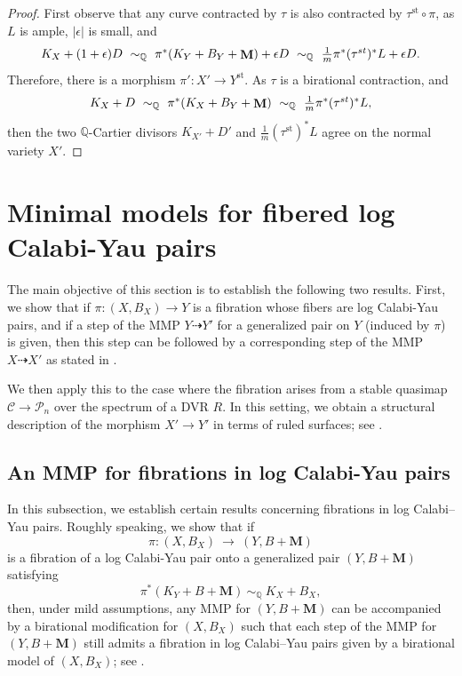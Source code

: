 \documentclass[a4paper,12pt]{amsart}
\DeclareMathOperator{\st}{st}
\newcommand{\bQ}{{\mathbb Q}}
\newcommand{\sP}{{\mathscr{P}}}
\DeclareMathOperator{\bfM}{{\bf{M}}}
\newcommand\cC{{\mathcal{C}}}
\theoremstyle{definition}
\theoremstyle{remark}
\begin{document}
\begin{proof}
First observe that any curve contracted by $\tau$ is also contracted by $\tau^{\st}\circ \pi$, as $L$ is ample, $|\epsilon|$ is small, and
\[\textstyle
K_X+(1+\epsilon)D \ \sim_\bQ\  \pi^*(K_Y+B_Y+\bfM) +\epsilon D \ \sim_{\bQ} \ \frac{1}{m}\pi^*(\tau^{st})^*L+\epsilon D .
\]
    Therefore, there is a morphism $\pi'\colon X'\to Y^{\st}$. As $\tau$ is a birational contraction, and \[\textstyle K_X+D\ \sim_\bQ\  \pi^*(K_X+B_Y+\bfM) \ \sim_\bQ \ \frac{1}{m}\pi^*(\tau^{st})^*L,\]
    then the two $\bQ$-Cartier divisors $K_{X'}+D'$ and $\frac{1}{m}(\tau^{\st})^*L$ agree on the normal variety $X'$.
\end{proof}



\section{Minimal models for fibered log Calabi-Yau pairs}\label{section_stable_reduction}


The main objective of this section is to establish the following two results.  
First, we show that if $\pi\colon (X,B_X) \to Y$ is a fibration whose fibers are log Calabi-Yau pairs, and if a step of the MMP 
$Y \dashrightarrow Y'$ for a generalized pair on \(Y\) (induced by \(\pi\)) is given, then this step can be followed by a corresponding step of the MMP 
\(X \dashrightarrow X'\) as stated in .  

We then apply this to the case where the fibration arises from a stable quasimap \(\cC \to \sP_n\)
over the spectrum of a DVR \(R\). In this setting, we obtain a structural description of the morphism \(X' \to Y'\) in terms of ruled surfaces; see .





\subsection{An MMP for fibrations in log Calabi-Yau pairs}\label{section_mmp}


In this subsection, we establish certain results concerning fibrations in log Calabi--Yau pairs. Roughly speaking, we show that if 
\[
\pi\colon (X,B_X) \ \longrightarrow \ (Y,B+\mathbf{M})
\]
is a fibration of a log Calabi-Yau pair onto a generalized pair \((Y,B+\mathbf{M})\) satisfying 
\[
\pi^*(K_Y+B+\mathbf{M})  \ \sim_{\mathbb{Q}} \ K_X+B_X,
\]
then, under mild assumptions, any MMP for \((Y,B+\mathbf{M})\) can be accompanied by a birational modification for \((X,B_X)\) such that each step of the MMP for \((Y,B+\mathbf{M})\) still admits a fibration in log Calabi--Yau pairs given by a birational model of \((X,B_X)\); see .
\end{document}

